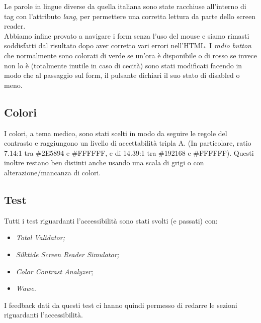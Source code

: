 Le parole in lingue diverse da quella italiana sono state racchiuse all'interno di tag con l'attributo \textit{lang}, per permettere una corretta lettura da parte dello screen reader.\\


Abbiamo infine provato a navigare i form senza l’uso del mouse e siamo rimasti soddisfatti dal risultato dopo aver corretto vari errori nell’HTML.
I \textit{radio button} che normalmente sono colorati di verde se un’ora è disponibile o di rosso se invece non lo è (totalmente inutile in caso di cecità) sono stati modificati facendo in modo che al passaggio sul form, il pulsante dichiari il suo stato di disabled o meno.\\

\subsection{Colori}

I colori, a tema medico, sono stati scelti in modo da seguire le regole del contrasto e raggiungono un livello di accettabilità tripla A. (In particolare, ratio 7.14:1 tra \#2E5894 e \#FFFFFF, e di 14.39:1 tra \#192168 e \#FFFFFF).
Questi inoltre restano ben distinti anche usando una scala di grigi o con alterazione/mancanza di colori.\\

\subsection{Test}

Tutti i test riguardanti l’accessibilità sono stati svolti (e passati) con:
\begin{itemize}
\item \textit{Total Validator;}
\item \textit{Silktide Screen Reader Simulator;}
\item \textit{Color Contrast Analyzer};
\item \textit{Wawe.}
\end{itemize}

I feedback dati da questi test ci hanno quindi permesso di redarre le sezioni riguardanti l'accessibilità.

